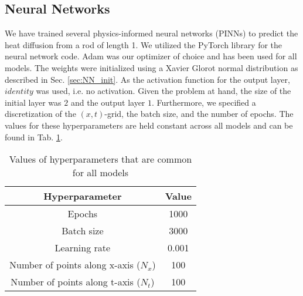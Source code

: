 \subsection{Neural Networks}

We have trained several physics-informed neural networks (PINNs) to predict the heat diffusion from a rod of length 1.
We utilized the PyTorch library \cite{Ansel_PyTorch_2_Faster_2024} for the neural network code. 
Adam was our optimizer of choice and has been used for all models. 
The weights were initialized using a Xavier Glorot normal distribution as described in Sec. \ref{sec:NN_init}. 
As the activation function for the output layer, $identity$ was used, i.e. no activation. 
Given the problem at hand, the size of the initial layer was $2$ and the output layer $1$. 
Furthermore, we specified a discretization of the $(x,t)$-grid, the batch size, and the number of epochs. 
The values for these hyperparameters are held constant across all models and can be found in Tab. \ref{tab:valuesfornn}. 

\begin{table}[h!]
    \centering
    \begin{tabular}{|c|c|}
    \hline
        \textbf{Hyperparameter} & \textbf{Value}  \\ \hline
        Epochs & 1000  \\ \hline
        Batch size & 3000 \\\hline
        Learning rate & 0.001 \\ \hline
        Number of points along x-axis ($N_x$) & 100 \\ \hline
        Number of points along t-axis ($N_t$) & 100 \\ \hline
    \end{tabular}
    \caption{Values of hyperparameters that are common for all models}
    \label{tab:valuesfornn}
\end{table}




